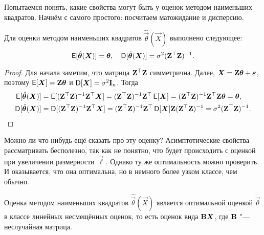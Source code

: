 Попытаемся понять, какие свойства могут быть у оценок методом наименьших квадратов. Начнём с самого простого: посчитаем матожидание и дисперсию.
\begin{lemma}
	Для оценки методом наименьших квадратов $\hat{\vec{\theta}}(\vec{X})$ выполнено следующее:
	\[
		\operatorname{\mathsf{E}}[\hat{\bm{\theta}}(\bm{X})] = \bm{\theta}, 
		\quad
		\operatorname{\mathsf{D}}[\hat{\bm{\theta}}(\bm{X})] = \sigma^{2}(\mathbf{Z}^{\top}\mathbf{Z})^{-1}.
	\]
\end{lemma}
\begin{proof}
	Для начала заметим, что матрица $\mathbf{Z}^{\top}\mathbf{Z}$ симметрична. Далее, $\bm{X} = \mathbf{Z}\bm{\theta} + \bm{\varepsilon}$, поэтому $\operatorname{\mathsf{E}}[\bm{X}] = \mathbf{Z}\bm{\theta}$ и $\operatorname{\mathsf{D}}[\bm{X}] = \sigma^{2}\mathbf{I}_{n}$. Тогда
	\begin{align*}
		\operatorname{\mathsf{E}}[\hat{\bm{\theta}}(\bm{X})]
		&= \operatorname{\mathsf{E}}[(\mathbf{Z}^{\top}\mathbf{Z})^{-1}\mathbf{Z}^{\top}\bm{X}]
		= (\mathbf{Z}^{\top}\mathbf{Z})^{-1}\mathbf{Z}^{\top}\operatorname{\mathsf{E}}[\bm{X}]
		= (\mathbf{Z}^{\top}\mathbf{Z})^{-1}\mathbf{Z}^{\top}\mathbf{Z}\bm{\theta}
		= \bm{\theta}, \\
		\operatorname{\mathsf{D}}[\hat{\bm{\theta}}(\bm{X})] 
		&= \operatorname{\mathsf{D}}[(\mathbf{Z}^{\top}\mathbf{Z})^{-1}\mathbf{Z}^{\top}\bm{X}]
		= (\mathbf{Z}^{\top}\mathbf{Z})^{-1}\mathbf{Z}^{\top}\operatorname{\mathsf{D}}[\bm{X}]\mathbf{Z}(\mathbf{Z}^{\top}\mathbf{Z})^{-1}
		= \sigma^{2}(\mathbf{Z}^{\top}\mathbf{Z})^{-1}. \qedhere
	\end{align*}
\end{proof}
Можно ли что-нибудь ещё сказать про эту оценку? Асимптотические свойства рассматривать бесполезно, так как не понятно, что будет происходить с оценкой при увеличении размерности $\vec{\ell}$. Однако ту же оптимальность можно проверить. И оказывается, что она оптимальна, но в немного более узком классе, чем обычно.
\begin{lemma}
	Оценка методом наименьших квадратов $\hat{\vec{\theta}}(\vec{X})$ является оптимальной оценкой $\vec{\theta}$ в классе линейных несмещённых оценок, то есть оценок вида $\mathbf{B}\bm{X}$, где $\mathbf{B}$ "--- неслучайная матрица.
\end{lemma}
